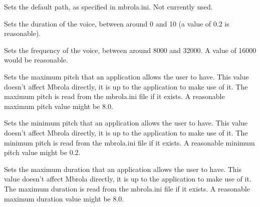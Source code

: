 \label{wxmbrolasetdefaultpath}




Sets the default path, as specified in mbrola.ini. Not currently used.

\label{wxmbrolasetduration}


Sets the duration of the voice, between around 0 and 10 (a value of 0.2 is reasonable).

\label{wxmbrolasetfreq}


Sets the frequency of the voice, between around 8000 and 32000. A value of 16000 would be reasonable.

\label{wxmbrolasetmaxpitch}


Sets the maximum pitch that an application allows the user to have. This value doesn't
affect Mbrola directly, it is up to the application to make use of it. The maximum
pitch is read from the mbrola.ini file if it exists. A reasonable maximum pitch value might be 8.0.

\label{wxmbrolasetminpitch}


Sets the minimum pitch that an application allows the user to have. This value doesn't
affect Mbrola directly, it is up to the application to make use of it. The minimum
pitch is read from the mbrola.ini file if it exists. A reasonable minimum pitch value might be 0.2.

\label{wxmbrolasetmaxduration}


Sets the maximum duration that an application allows the user to have. This value doesn't
affect Mbrola directly, it is up to the application to make use of it. The maximum
duration is read from the mbrola.ini file if it exists. A reasonable maximum duration value might be 8.0.


